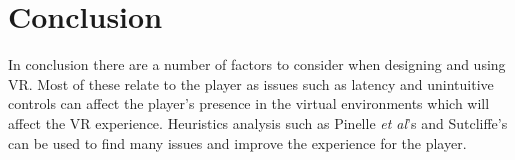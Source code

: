 \documentclass{scrartcl}
\begin{document}
\section{Conclusion}
In conclusion there are a number of factors to consider when designing and using VR. Most of these relate to the player as issues such as latency and unintuitive controls can affect the player's presence in the virtual environments which will affect the VR experience. Heuristics analysis such as Pinelle \textit{et al}'s and Sutcliffe's can be used to find many issues and improve the experience for the player.
	


	
\end{document}
